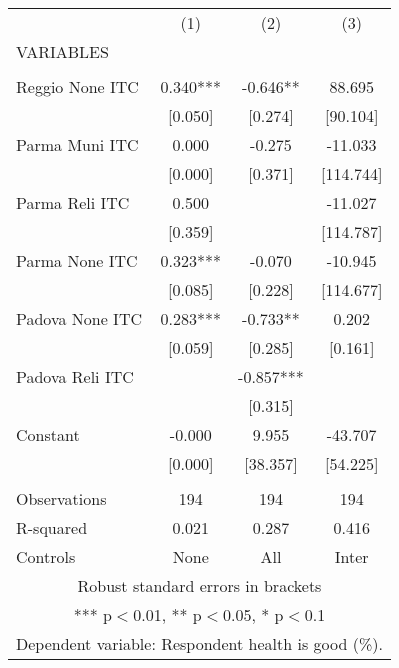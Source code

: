 \begin{tabular}{lccc} \hline
 & (1) & (2) & (3) \\
VARIABLES &  &  &  \\ \hline
 &  &  &  \\
Reggio None ITC & 0.340*** & -0.646** & 88.695 \\
 & [0.050] & [0.274] & [90.104] \\
Parma Muni ITC & 0.000 & -0.275 & -11.033 \\
 & [0.000] & [0.371] & [114.744] \\
Parma Reli ITC & 0.500 &  & -11.027 \\
 & [0.359] &  & [114.787] \\
Parma None ITC & 0.323*** & -0.070 & -10.945 \\
 & [0.085] & [0.228] & [114.677] \\
Padova None ITC & 0.283*** & -0.733** & 0.202 \\
 & [0.059] & [0.285] & [0.161] \\
Padova Reli ITC &  & -0.857*** &  \\
 &  & [0.315] &  \\
Constant & -0.000 & 9.955 & -43.707 \\
 & [0.000] & [38.357] & [54.225] \\
 &  &  &  \\
Observations & 194 & 194 & 194 \\
R-squared & 0.021 & 0.287 & 0.416 \\
 Controls & None & All & Inter \\ \hline
\multicolumn{4}{c}{ Robust standard errors in brackets} \\
\multicolumn{4}{c}{ *** p$<$0.01, ** p$<$0.05, * p$<$0.1} \\
\multicolumn{4}{c}{ Dependent variable: Respondent health is good (\%).} \\
\end{tabular}
